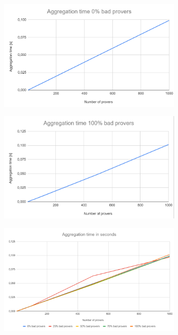 \begin{figure}
\centering
\begin{subfigure}[t]{.49\textwidth}
  \includegraphics[width=.90\linewidth]{Images/aggregation_0.png}  
  \caption{}
  \label{fig:aggregation_0}
\end{subfigure}
\hfill
\begin{subfigure}[t]{.49\textwidth}
  \includegraphics[width=.90\linewidth]{Images/aggregation_100.png}  
  \caption{}
  \label{fig:aggregation_100}
\end{subfigure}
\hfill
\begin{subfigure}[t]{.49\textwidth}
  \includegraphics[width=.90\linewidth]{Images/aggregation_comparison.png}  

\end{subfigure}
\end{figure}
